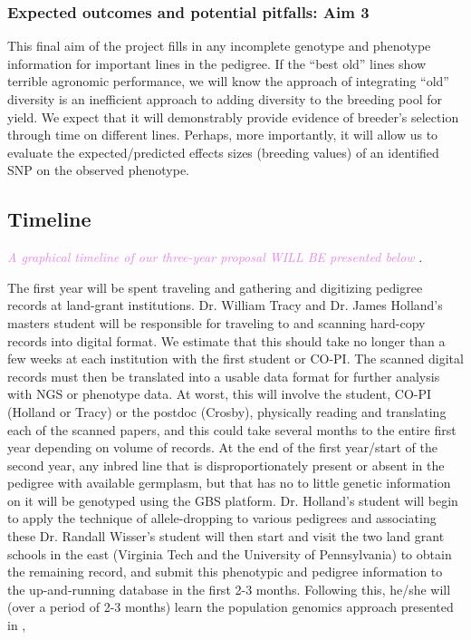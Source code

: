 \documentclass[12pt]{article}
\newcommand{\kc}[1]{\textcolor{violet}{ \emph{\scriptsize  #1}} }
\begin{document}
\subsubsection*{Expected outcomes and potential pitfalls: Aim 3}
This final aim of the project fills in any incomplete genotype and phenotype information for important lines in the pedigree. If the ``best old'' lines show terrible agronomic performance, we will know the approach of integrating ``old'' diversity is an inefficient approach to adding diversity to the breeding pool for yield. 
We expect that it will demonstrably provide evidence of breeder's selection through time on different lines.
Perhaps, more importantly, it will allow us to evaluate the expected/predicted effects sizes (breeding values) of an identified SNP on the observed phenotype. 



\subsection*{Timeline}
\kc{A graphical timeline of our three-year proposal WILL BE presented below}. 

The first year will be spent traveling and gathering and digitizing pedigree records at land-grant institutions.
Dr. William Tracy and Dr. James Holland's masters student will be responsible for traveling to and scanning hard-copy records into digital format.  We estimate that this should take no longer than a few weeks at each institution with the first student or CO-PI. 
The scanned digital records must then be translated into a usable data format for further analysis with NGS or phenotype data. At worst, this will involve the student, CO-PI (Holland or Tracy) or the postdoc (Crosby), physically reading and translating each of the scanned papers, and this could take several months to the entire first year depending on volume of records. 
At the end of the first year/start of the second year, any inbred line that is disproportionately present or absent in the pedigree with available germplasm, but that has no to little genetic information on it will be genotyped using the GBS platform. 
Dr. Holland's student will begin to apply the technique of allele-dropping to various pedigrees and associating these
Dr. Randall Wisser's student will then start and visit the two land grant schools in the east (Virginia Tech and the University of Pennsylvania) to obtain the remaining record, and submit this phenotypic and pedigree information to the up-and-running database in the first 2-3 months. Following this, he/she will (over a period of 2-3 months) learn the population genomics approach presented in \citep{Berg:2014bs},


\newpage

\end{document}

